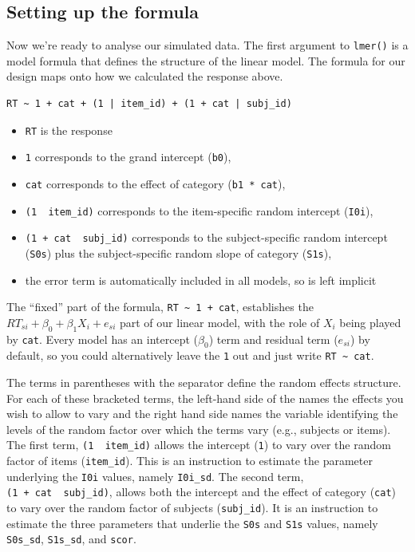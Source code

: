 \documentclass[doc,floatsintext]{apa6}
\providecommand{\tightlist}{%
  \setlength{\itemsep}{0pt}\setlength{\parskip}{0pt}}
\begin{document}
\hypertarget{setting-up-the-formula}{%
\subsection{Setting up the formula}\label{setting-up-the-formula}}

Now we're ready to analyse our simulated data. The first argument to \texttt{lmer()} is a model formula that defines the structure of the linear model. The formula for our design maps onto how we calculated the response above.

\begin{verbatim}
RT ~ 1 + cat + (1 | item_id) + (1 + cat | subj_id)
\end{verbatim}

\begin{itemize}
\tightlist
\item
  \texttt{RT} is the response
\item
  \texttt{1} corresponds to the grand intercept (\texttt{b0}),
\item
  \texttt{cat} corresponds to the effect of category (\texttt{b1\ *\ cat}),
\item
  \texttt{(1\ \textbar{}\ item\_id)} corresponds to the item-specific random intercept (\texttt{I0i}),
\item
  \texttt{(1\ +\ cat\ \textbar{}\ subj\_id)} corresponds to the subject-specific random intercept (\texttt{S0s}) plus the subject-specific random slope of category (\texttt{S1s}),
\item
  the error term is automatically included in all models, so is left implicit
\end{itemize}

The \enquote{fixed} part of the formula, \texttt{RT\ \textasciitilde{}\ 1\ +\ cat}, establishes the \(RT_{si} + \beta_0 + \beta_1 X_i + e_{si}\) part of our linear model, with the role of \(X_i\) being played by \texttt{cat}. Every model has an intercept (\(\beta_0\)) term and residual term (\(e_{si}\)) by default, so you could alternatively leave the \texttt{1} out and just write \texttt{RT\ \textasciitilde{}\ cat}.

The terms in parentheses with the \texttt{\textbar{}} separator define the random effects structure. For each of these bracketed terms, the left-hand side of the \texttt{\textbar{}} names the effects you wish to allow to vary and the right hand side names the variable identifying the levels of the random factor over which the terms vary (e.g., subjects or items). The first term, \texttt{(1\ \textbar{}\ item\_id)} allows the intercept (\texttt{1}) to vary over the random factor of items (\texttt{item\_id}). This is an instruction to estimate the parameter underlying the \texttt{I0i} values, namely \texttt{I0i\_sd}. The second term, \texttt{(1\ +\ cat\ \textbar{}\ subj\_id)}, allows both the intercept and the effect of category (\texttt{cat}) to vary over the random factor of subjects (\texttt{subj\_id}). It is an instruction to estimate the three parameters that underlie the \texttt{S0s} and \texttt{S1s} values, namely \texttt{S0s\_sd}, \texttt{S1s\_sd}, and \texttt{scor}.
\end{document}
